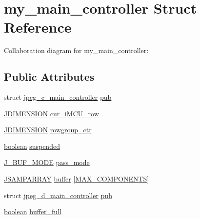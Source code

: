 \hypertarget{structmy__main__controller}{}\section{my\+\_\+main\+\_\+controller Struct Reference}
\label{structmy__main__controller}


Collaboration diagram for my\+\_\+main\+\_\+controller\+:
\subsection*{Public Attributes}
\begin{DoxyCompactItemize}
\item 
struct \mbox{\hyperlink{structjpeg__c__main__controller}{jpeg\+\_\+c\+\_\+main\+\_\+controller}} \mbox{\hyperlink{structmy__main__controller_af6cfb28f856f55e4a715c8036f08c52f}{pub}}
\item 
\mbox{\hyperlink{jmorecfg_8h_a04ed4674f6f1d0d50ec241531e38274f}{J\+D\+I\+M\+E\+N\+S\+I\+ON}} \mbox{\hyperlink{structmy__main__controller_a1c6081c98910d41e03fa33763a832a6f}{cur\+\_\+i\+M\+C\+U\+\_\+row}}
\item 
\mbox{\hyperlink{jmorecfg_8h_a04ed4674f6f1d0d50ec241531e38274f}{J\+D\+I\+M\+E\+N\+S\+I\+ON}} \mbox{\hyperlink{structmy__main__controller_a41bedbcd86bdc7611550440e02b8f93b}{rowgroup\+\_\+ctr}}
\item 
\mbox{\hyperlink{jmorecfg_8h_a7c6368b321bd9acd0149b030bb8275ed}{boolean}} \mbox{\hyperlink{structmy__main__controller_aaae0f416fa5716cf5e0d295a191b2186}{suspended}}
\item 
\mbox{\hyperlink{jpegint_8h_a1f0803342372ac62b6903c399399c874}{J\+\_\+\+B\+U\+F\+\_\+\+M\+O\+DE}} \mbox{\hyperlink{structmy__main__controller_a2de588274979de6f92951740a6e9d0ac}{pass\+\_\+mode}}
\item 
\mbox{\hyperlink{jpeglib_8h_ac9d5d1b829ed51769db69a37271a7e91}{J\+S\+A\+M\+P\+A\+R\+R\+AY}} \mbox{\hyperlink{structmy__main__controller_a448676ac307b69b99e5457744515f058}{buffer}} \mbox{[}\mbox{\hyperlink{jmorecfg_8h_a6d8c910a1fdb6d4762a05f7250e64322}{M\+A\+X\+\_\+\+C\+O\+M\+P\+O\+N\+E\+N\+TS}}\mbox{]}
\item 
struct \mbox{\hyperlink{structjpeg__d__main__controller}{jpeg\+\_\+d\+\_\+main\+\_\+controller}} \mbox{\hyperlink{structmy__main__controller_a4880459c57978ea5fcfef2a1acbfc3fe}{pub}}
\item 
\mbox{\hyperlink{jmorecfg_8h_a7c6368b321bd9acd0149b030bb8275ed}{boolean}} \mbox{\hyperlink{structmy__main__controller_a6cd3c916b4d87c97f6fda7daa0816256}{buffer\+\_\+full}}

\end{DoxyCompactItemize}
